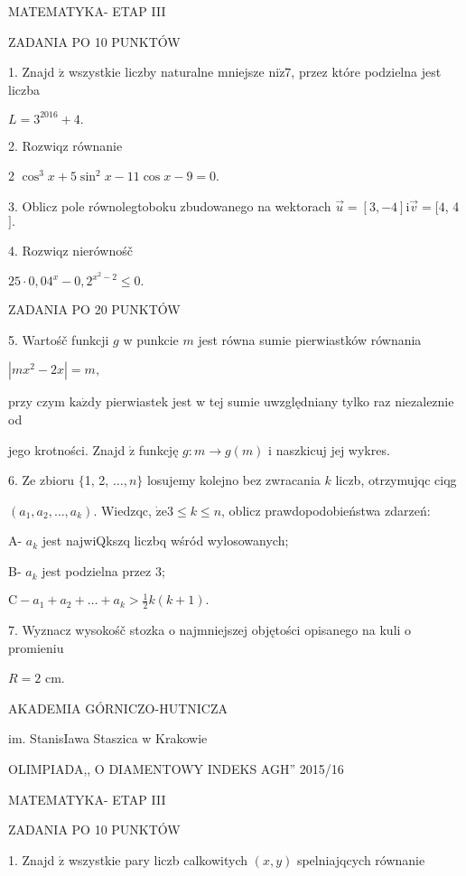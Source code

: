 \documentclass[a4paper,12pt]{article}
\begin{document}
MATEMATYKA- ETAP III

ZADANIA PO 10 PUNKTÓW

1. Znajd $\acute{\mathrm{z}}$ wszystkie liczby naturalne mniejsze $\mathrm{n}\mathrm{i}\dot{\mathrm{z}}7$, przez które podzielna jest liczba

$L=3^{2016}+4.$

2. Rozwiqz równanie

2 $\cos^{3}x+5\sin^{2}x-11\cos x-9=0.$

3. Oblicz pole równolegtoboku zbudowanego na wektorach $\vec{u}=[3,-4]\mathrm{i}\vec{v}=[4$, 4$].$

4. Rozwiqz nierównośč

$25\cdot 0,04^{x}-0,2^{x^{2}-2}\leq 0.$

ZADANIA PO 20 PUNKTÓW

5. Wartośč funkcji $g$ w punkcie $m$ jest równa sumie pierwiastków równania

$|mx^{2}-2x|=m,$

przy czym $\mathrm{k}\mathrm{a}\dot{\mathrm{z}}\mathrm{d}\mathrm{y}$ pierwiastek jest w tej sumie uwzględniany tylko raz niezaleznie od

jego krotności. Znajd $\acute{\mathrm{z}}$ funkcję $g:m\rightarrow g(m)$ i naszkicuj jej wykres.

6. Ze zbioru $\{$1, 2, $\ldots, n\}$ losujemy kolejno bez zwracania $k$ liczb, otrzymujqc ciqg

$(a_{1},a_{2},\ldots,a_{k})$. Wiedzqc, $\dot{\mathrm{z}}\mathrm{e}3\leq k\leq n$, oblicz prawdopodobieństwa zdarzeń:

A- $a_{k}$ jest najwiQkszq liczbq wśród wylosowanych;

B- $a_{k}$ jest podzielna przez 3;

$\displaystyle \mathrm{C}-a_{1}+a_{2}+\ldots+a_{k}>\frac{1}{2}k(k+1).$

7. Wyznacz wysokośč stozka o najmniejszej objętości opisanego na kuli o promieniu

$R=2$ cm.






AKADEMIA GÓRNICZO-HUTNICZA

im. StanisIawa Staszica w Krakowie

OLIMPIADA,, O DIAMENTOWY INDEKS AGH'' 2015/16

MATEMATYKA- ETAP III

ZADANIA PO 10 PUNKTÓW

1. Znajd $\acute{\mathrm{z}}$ wszystkie pary liczb calkowitych $(x,y)$ spelniajqcych równanie
\end{document}
